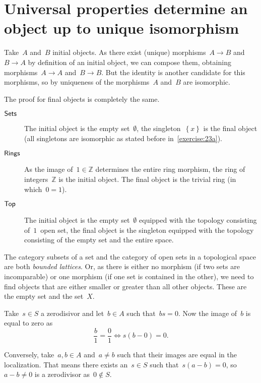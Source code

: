\section{Universal properties determine an object up to unique isomorphism}

\begin{exercise}
  \label{exercise:23a}
  Take~$A$ and~$B$ initial objects. As there exist (unique) morphisms~$A\to B$ and~$B\to A$ by definition of an initial object, we can compose them, obtaining morphisms~$A\to A$ and~$B\to B$. But the identity is another candidate for this morphisms, so by uniqueness of the morphisms~$A$ and~$B$ are isomorphic.

  The proof for final objects is completely the same.
\end{exercise}

\begin{exercise}
  \begin{description}
    \item[$\mathsf{Sets}$] The initial object is the empty set~$\emptyset$, the singleton~$\left\{ x \right\}$ is the final object (all singletons are isomorphic as stated before in~\autoref{exercise:23a}).
    \item[$\mathsf{Rings}$] As the image of~$1\in\mathbb{Z}$ determines the entire ring morphism, the ring of integers~$\mathbb{Z}$ is the initial object. The final object is the trivial ring (in which~$0=1$).
    \item[$\mathsf{Top}$] The initial object is the empty set~$\emptyset$ equipped with the topology consisting of~$1$~open set, the final object is the singleton equipped with the topology consisting of the empty set and the entire space.
  \end{description}

  The category subsets of a set and the category of open sets in a topological space are both \emph{bounded lattices}. Or, as there is either no morphism (if two sets are incomparable) or one morphism (if one set is contained in the other), we need to find objects that are either smaller or greater than all other objects. These are the empty set and the set~$X$.
\end{exercise}

\begin{exercise}
  Take~$s\in S$ a zerodisivor and let~$b\in A$ such that~$bs=0$. Now the image of~$b$ is equal to zero as
  \begin{equation}
    \frac{b}{1}=\frac{0}{1}\Longleftrightarrow s\left( b-0 \right)=0.
  \end{equation}

  Conversely, take~$a,b\in A$ and~$a\neq b$ such that their images are equal in the localization. That means there exists an~$s\in S$ such that~$s(a-b)=0$, so~$a-b\neq 0$ is a zerodivisor as~$0\notin S$.
\end{exercise}

